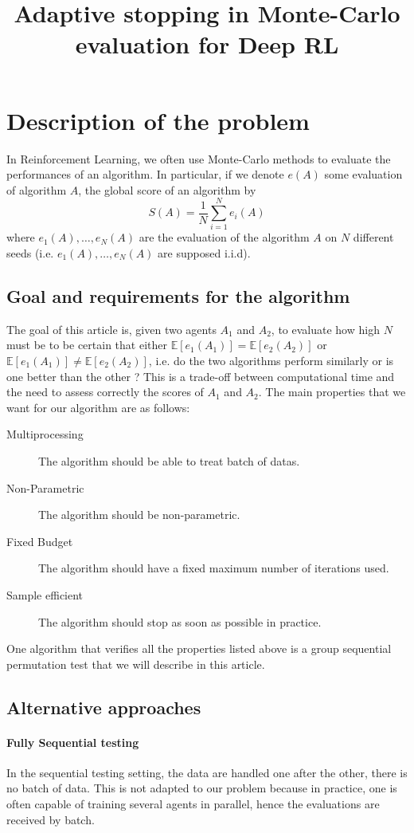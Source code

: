 \documentclass{article}
\title{Adaptive stopping in Monte-Carlo evaluation for Deep RL}
\date{}
\theoremstyle{plain}
\theoremstyle{remark}
\newcommand{\E}{\mathbb{E}}
\newcommand{\1}{\mathbbm{1}}
\numberwithin{equation}{section}
\begin{document}
\maketitle
\section{Description of the problem}
In Reinforcement Learning, we often use Monte-Carlo methods to evaluate the performances of an algorithm. In particular, if we denote $e(A)$ some evaluation of algorithm $A$, the global score of an algorithm by
$$S(A)=\frac{1}{N}\sum_{i=1}^N e_i(A) $$
where $e_1(A), \dots,e_N(A)$ are the evaluation of the algorithm $A$ on $N$ different seeds (i.e. $e_1(A),\dots,e_N(A)$ are supposed i.i.d).

\subsection{Goal and requirements for the algorithm}

The goal of this article is, given two agents $A_1$ and $A_2$, to evaluate how high $N$ must be to be certain that either $\E[e_1(A_1)]=\E[e_2(A_2)]$ or $\E[e_1(A_1)]\neq \E[e_2(A_2)]$, i.e. do the two algorithms perform similarly or is one better than the other ? This is a trade-off between computational time and the need to assess correctly the scores of $A_1$ and $A_2$. The main properties that we want for our algorithm are as follows:

\begin{description}
\item[Multiprocessing] The algorithm should be able to treat batch of datas.
\item[Non-Parametric] The algorithm should be non-parametric.
\item[Fixed Budget] The algorithm should have a fixed maximum number of iterations used.
\item[Sample efficient] The algorithm should stop as soon as possible in practice.
\end{description}

One algorithm that verifies all the properties listed above is a group sequential permutation test that we will describe in this article.

\subsection{Alternative approaches}

\paragraph{Fully Sequential testing}
In the sequential testing setting, the data are handled one after the other, there is no batch of data. This is not adapted to our problem because in practice, one is often capable of training several agents in parallel, hence the evaluations are received by batch.
\end{document}
